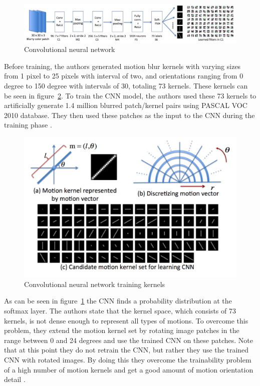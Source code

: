 \documentclass[10pt,twocolumn,letterpaper]{article}
\begin{document}
\begin{figure} [t]
\begin{center}
\includegraphics[width=1\linewidth]{CNN.pdf}
\caption{Convolutional neural network}
\label{fig:figureCNN}
\end{center}
\end{figure}

Before training, the authors generated motion blur kernels with varying sizes from 1 pixel to 25 pixels with interval of two, and orientations ranging from 0 degree to 150 degree with intervals of 30, totaling 73 kernels. These kernels can be seen in figure~\ref{fig:figurekernels}. To train the CNN model, the authors used these 73 kernels to artificially generate 1.4 million blurred patch/kernel pairs using PASCAL VOC 2010 database. They then used these patches as the input to the CNN during the training phase \cite{sun2015learning}.

\begin{figure} [t]
\begin{center}
\includegraphics[width=0.9\linewidth]{kernels.pdf}
\caption{Convolutional neural network training kernels}
\label{fig:figurekernels}
\end{center}
\end{figure}

As can be seen in figure~\ref{fig:figureCNN} the CNN finds a probability distribution at the softmax layer. The authors state that the kernel space, which consists of 73 kernels, is not dense enough to represent all types of motions. To overcome this problem, they extend the motion kernel set by rotating image patches in the range between 0 and 24 degrees and use the trained CNN on these patches. Note that at this point they do not retrain the CNN, but rather they use the trained CNN with rotated images. By doing this they overcome the trainability problem of a high number of motion kernels and get a good amount of motion orientation detail \cite{sun2015learning}.
\end{document}
